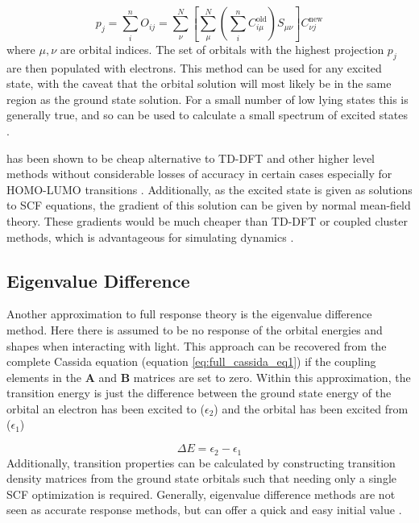 \begin{equation}
p_j = \sum^n_i O_{ij} = \sum^N_\nu \left[\sum^N_\mu\left(\sum^n_i C_{i\mu}^{\text{old}}\right)S_{\mu\nu}\right]C^{\text{new}}_{\nu j}
\end{equation}
%
where $\mu,\nu$ are orbital indices. The set of orbitals with the highest projection
$p_j$ are then populated with electrons.  This method can be used for any
excited state, with the caveat that the orbital solution will most likely be in
the same region as the ground state solution. For a small number of low lying states
this is generally true, and so \dscf can be used to calculate a small spectrum of
excited states \cite{Gilbert2008}.

\dscf has been shown to be cheap alternative to TD-DFT and other higher level methods 
\cite{Liu2004, Gavnholt2008, Besley2009} without considerable losses of accuracy 
in certain cases especially for HOMO-LUMO transitions \cite{Kowalczyk2011}. Additionally,
as the excited state is given as solutions to SCF equations, the gradient of this
solution can be given by normal mean-field theory. These gradients would be much
cheaper than TD-DFT or coupled cluster methods, which is advantageous for simulating
dynamics \cite{Gavnholt2008}.

\subsection{Eigenvalue Difference}
\label{subsec:eigval_diff}
Another approximation to full response theory is the eigenvalue difference method. 
Here there is assumed to be no response of the orbital energies and shapes when 
interacting with light. This approach can be recovered from the complete Cassida
equation (equation \ref{eq:full_cassida_eq1}) if the coupling elements in the $\mathbf{A}$ 
and $\mathbf{B}$ matrices are set to zero. Within this approximation, the transition
energy is just the difference between the ground state energy of the orbital an 
electron has been excited to ($\epsilon_{\text{2}}$) and the orbital has been excited
from ($\epsilon_{\text{1}}$)

\begin{equation}
\Delta E = \epsilon_{\text{2}} - \epsilon_{\text{1}}
\end{equation}
%
Additionally, transition properties can be calculated by constructing transition 
density matrices from the ground state orbitals such that needing only a single 
SCF optimization is required. Generally, eigenvalue difference methods are not 
seen as accurate response methods, but can offer a quick and easy initial value 
\cite{Gimon2009}.

